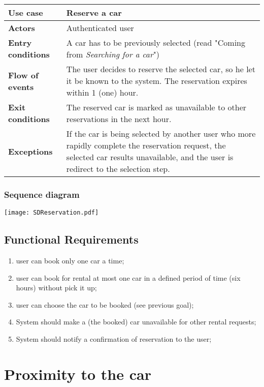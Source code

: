 \documentclass{scrreprt}
\begin{document}
\begin{center}
\begin{tabularx}{\columnwidth}{>{\bfseries}lX}
\toprule
Use case & Reserve a car\\
\midrule
Actors & Authenticated user\\
\midrule
Entry conditions & A car has to be previously selected (read "Coming from \emph{Searching for a car}")\\
\midrule
Flow of events & The user decides to reserve the selected car, so he let it be known to the system. The reservation expires within 1 (one) hour.\\
\midrule
Exit conditions & The reserved car is marked as unavailable to other reservations in the next hour.\\
\midrule
Exceptions & If the car is being selected by another user who more rapidly complete the reservation request, the selected car results unavailable, and the user is redirect to the selection step.\\
\bottomrule
\end{tabularx}
\end{center}

\subsubsection{Sequence diagram}
\begin{center}
\texttt{[image: SDReservation.pdf]}
\end{center}

\subsection{Functional Requirements}
\begin{enumerate}[label=R\arabic*.,resume]
\item user can book only one car a time;
\item user can book for rental at most one car in a defined period of time (six hours) without pick it up;
\item user can choose the car to be booked (see previous goal);
\item System should make a (the booked) car unavailable for other rental requests;
\item System should notify a confirmation of reservation to the user;
\end{enumerate}

\section{Proximity to the car}
\label{sec:proximity}
\end{document}
